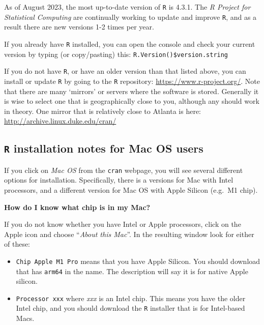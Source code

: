 \documentclass[
]{book}
\providecommand{\tightlist}{%
  \setlength{\itemsep}{0pt}\setlength{\parskip}{0pt}}
\newenvironment{rmdtip}[1]
  {
  \begin{itemize}
  \renewcommand{\labelitemi}{
    \raisebox{-.7\height}[0pt][0pt]{
      {\setkeys{Gin}{width=3em,keepaspectratio}\texttt{[image: images/\#1]}}
    }
  }
  \setlength{\fboxsep}{1em}
  \begin{tip}
  \item
  }
  {
  \end{tip}
  \end{itemize}
  }
\begin{document}
As of August 2023, the most up-to-date version of \texttt{R} is 4.3.1. The \emph{R Project for Statistical Computing} are continually working to update and improve \texttt{R}, and as a result there are new versions 1-2 times per year.

If you already have \texttt{R} installed, you can open the console and check your current version by typing (or copy/pasting) this: \texttt{R.Version()\$version.string}

If you do not have \texttt{R}, or have an older version than that listed above, you can install or update \texttt{R} by going to the \texttt{R} repository: \url{https://www.r-project.org/}. Note that there are many `mirrors' or servers where the software is stored. Generally it is wise to select one that is geographically close to you, although any should work in theory. One mirror that is relatively close to Atlanta is here: \url{http://archive.linux.duke.edu/cran/}

\hypertarget{r-installation-notes-for-mac-os-users}{%
\subsection{\texorpdfstring{\texttt{R} installation notes for Mac OS users}{R installation notes for Mac OS users}}\label{r-installation-notes-for-mac-os-users}}

If you click on \emph{Mac OS} from the \texttt{cran} webpage, you will see several different options for installation. Specifically, there is a versions for Mac with Intel processors, and a different version for Mac OS with Apple Silicon (e.g.~M1 chip).

\begin{rmdtip}{tip}

\textbf{How do I know what chip is in my Mac?}

If you do not know whether you have Intel or Apple processors, click on the Apple icon and choose ``\emph{About this Mac}''. In the resulting window look for either of these:

\begin{itemize}
\tightlist
\item
  \texttt{Chip\ Apple\ M1\ Pro} means that you have Apple Silicon. You should download that has \texttt{arm64} in the name. The description will say it is for native Apple silicon.
\item
  \texttt{Processor\ xxx} where \emph{xxx} is an Intel chip. This means you have the older Intel chip, and you should download the \texttt{R} installer that is for Intel-based Macs.
\end{itemize}

\end{rmdtip}
\end{document}
